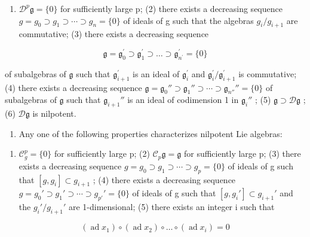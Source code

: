 \begin{enumerate}
\def\labelenumi{(\arabic{enumi})}
\tightlist
\item
  \(\mathcal{D}^{p}\mathfrak{g} = \{0\}\) for sufficiently large p; (2) there exists a decreasing sequence \(g = g_{0} \supset g_{1} \supset \cdots \supset g_{n} = \{0\}\) of ideals of g such that the algebras \(g_{i}/g_{i+1}\) are commutative; (3) there exists a decreasing sequence
\end{enumerate}

\[
\mathfrak {g} = \mathfrak {g} _ {0} ^ {\prime} \supset \mathfrak {g} _ {1} ^ {\prime} \supset \dots \supset \mathfrak {g} _ {n ^ {\prime}} ^ {\prime} = \{0 \}
\]

of subalgebras of \(\mathfrak{g}\) such that \(\mathfrak{g}_{i+1}^{\prime}\) is an ideal of \(\mathfrak{g}_i^{\prime}\) and \(\mathfrak{g}_i^{\prime}/\mathfrak{g}_{i+1}^{\prime}\) is commutative; (4) there exists a decreasing sequence \(\mathfrak{g} = \mathfrak{g}_0'' \supset \mathfrak{g}_1'' \supset \cdots \supset \mathfrak{g}_{n''}'' = \{0\}\) of subalgebras of \(\mathfrak{g}\) such that \(\mathfrak{g}_{i+1}''\) is an ideal of codimension 1 in \(\mathfrak{g}_i''\) ; (5) \(\mathfrak{g} \supset \mathcal{D}\mathfrak{g}\) ; (6) \(\mathcal{D}\mathfrak{g}\) is nilpotent.

\begin{enumerate}
\def\labelenumi{(\Roman{enumi})}
\setcounter{enumi}{3}
\tightlist
\item
  Any one of the following properties characterizes nilpotent Lie algebras:
\end{enumerate}

\begin{enumerate}
\def\labelenumi{(\arabic{enumi})}
\tightlist
\item
  \(\mathcal{C}_{g}^{p} = \{0\}\) for sufficiently large p; (2) \(\mathcal{C}_{p}\mathfrak{g} = \mathfrak{g}\) for sufficiently large p; (3) there exists a decreasing sequence \(g = g_{0} \supset g_{1} \supset \cdots \supset g_{p} = \{0\}\) of ideals of g such that \([g, g_{i}] \subset g_{i+1}\) ; (4) there exists a decreasing sequence \(g = g_{0}' \supset g_{1}' \supset \cdots \supset g_{p'}' = \{0\}\) of ideals of g such that \([g, g_{i}'] \subset g_{i+1}'\) and the \(g_{i}'/g_{i+1}'\) are 1-dimensional; (5) there exists an integer i such that
\end{enumerate}

\[
\left(\operatorname{ad} x _ {1}\right) \circ \left(\operatorname{ad} x _ {2}\right) \circ \dots \circ \left(\operatorname{ad} x _ {i}\right) = 0
\]

